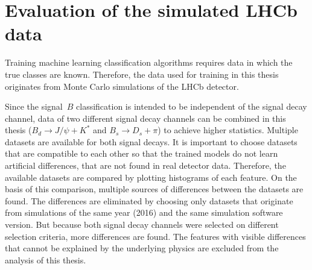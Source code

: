 \section{Evaluation of the simulated LHCb data}

Training machine learning classification algorithms requires data in which the true classes are known.
Therefore, the data used for training in this thesis originates from Monte Carlo simulations of the LHCb detector.

Since the signal~$B$ classification is intended to be independent of the signal decay channel, data of two different signal decay channels can be combined in this thesis ($B_d \rightarrow J/\psi + K^*$ and $B_s \rightarrow D_s + \pi$) to achieve higher statistics.
Multiple datasets are available for both signal decays. 
It is important to choose datasets that are compatible to each other so that the trained models do not learn artificial differences, that are not found in real detector data.
Therefore, the available datasets are compared by plotting histograms of each feature.
On the basis of this comparison, multiple sources of differences between the datasets are found.
The differences are eliminated by choosing only datasets that originate from simulations of the same year (2016) and the same simulation software version.
But because both signal decay channels were selected on different selection criteria, more differences are found.
The features with visible differences that cannot be explained by the underlying physics are excluded from the analysis of this thesis.




